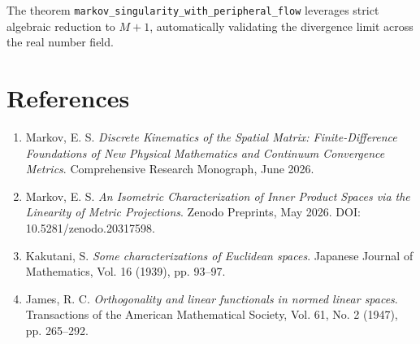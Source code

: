 \documentclass[12pt,fleqn]{article}
\begin{document}
The theorem \texttt{markov\_singularity\_with\_peripheral\_flow} leverages strict algebraic reduction to $M + 1$, automatically validating the divergence limit across the real number field.

\section*{References}
\begin{enumerate}
\itemsep=0pt
\item Markov, E. S. \textit{Discrete Kinematics of the Spatial Matrix: Finite-Difference Foundations of New Physical Mathematics and Continuum Convergence Metrics}. Comprehensive Research Monograph, June 2026.
\item Markov, E. S. \textit{An Isometric Characterization of Inner Product Spaces via the Linearity of Metric Projections}. Zenodo Preprints, May 2026. DOI: 10.5281/zenodo.20317598.
\item Kakutani, S. \textit{Some characterizations of Euclidean spaces}. Japanese Journal of Mathematics, Vol. 16 (1939), pp. 93--97.
\item James, R. C. \textit{Orthogonality and linear functionals in normed linear spaces}. Transactions of the American Mathematical Society, Vol. 61, No. 2 (1947), pp. 265--292.
\end{enumerate}
\end{document}
